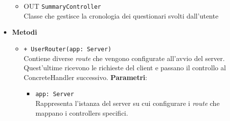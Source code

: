 \begin{itemize}
\begin{itemize}
		\item 
			OUT \texttt{SummaryController}\\
			Classe che gestisce la cronologia dei questionari svolti dall'utente
	\end{itemize}
		\item \textbf{Metodi} 
		\begin{itemize}
		\item 
		\texttt{+ UserRouter(app: Server)} \\
		Contiene diverse \textit{route} che vengono configurate all’avvio del server. Quest’ultime ricevono le richieste del client e passano il controllo al ConcreteHandler successivo.
		\textbf{Parametri}:
			\begin{itemize}
				\item 
				\texttt{app: Server} \\
				Rappresenta l’istanza del server su cui configurare i \textit{route} che mappano i controllers specifici.
			\end{itemize}
		\end{itemize}
\end{itemize}		